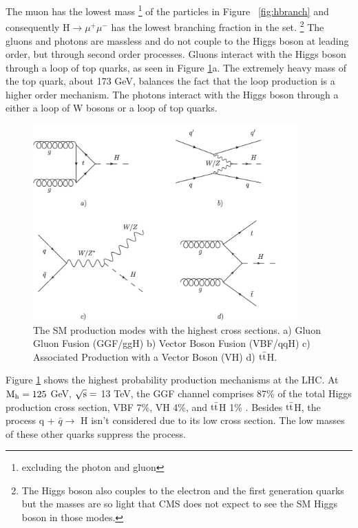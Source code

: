 The muon has the lowest mass \footnote{excluding the photon and gluon} of the particles in Figure ~\ref{fig:hbranch} and consequently H$\rightarrow \mu^{+}\mu^{-}$ has the lowest branching fraction in the set. \footnote{The Higgs boson also couples to the electron and the first generation quarks but the masses are so light that CMS does not expect to see the SM Higgs boson in those modes.} The gluons and photons are massless and do not couple to the Higgs boson at leading order, but through second order processes. Gluons interact with the Higgs boson through a loop of top quarks, as seen in Figure \ref{fig:hfeynprod}a. The extremely heavy mass of the top quark, about 173 GeV, balances the fact that the loop production is a higher order mechanism. The photons interact with the Higgs boson through a either a loop of W bosons or a loop of top quarks. 
\begin{figure}[h!]
  \centering
  \includegraphics[width=4in]{images/higgs_production_modes.png}
  \caption[Feynman diagrams for the Higgs boson production modes.]
   {The SM production modes with the highest cross sections. a) Gluon Gluon Fusion (GGF/ggH) b) Vector Boson Fusion (VBF/qqH) c) Associated Production with a Vector Boson (VH) d) ${\rm t\bar{t}}$H.}
  \label{fig:hfeynprod}
\end{figure}
Figure \ref{fig:hfeynprod} shows the highest probability production mechanisms at the LHC. At ${\rm M_{h} = 125}$ GeV, ${\rm \sqrt{s} =}$ 13 TeV, the GGF channel comprises 87\% of the total Higgs production cross section, VBF 7\%, VH 4\%, and ${\rm t\bar{t}}$H 1\% \cite{crossbranchplots}. Besides ${\rm t\bar{t}}$H, the process q + $\bar{q} \rightarrow$ H isn't considered due to its low cross section. The low masses of these other quarks suppress the process. 

